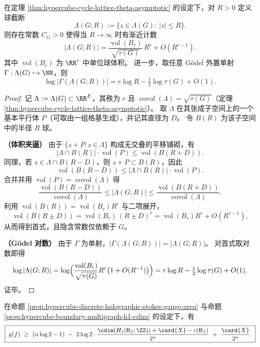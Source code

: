 \begin{corollary}\label{cor:hypercube-cycle-lattice-counting-godel-log}
在定理 \ref{thm:hypercube-cycle-lattice-theta-asymptotic} 的设定下，对 \(R>0\) 定义球截断
\[
\Lambda(G;R):=\{z\in\Lambda(G):\ |z|\le R\}.
\]
则存在常数 \(C_G>0\) 使得当 \(R\to\infty\) 时有渐近计数
\[
\boxed{\;
|\Lambda(G;R)|
=\frac{\operatorname{vol}(B_r)}{\sqrt{\tau(G)}}\,R^r+O(R^{r-1}).
\;}
\]
其中 \(\operatorname{vol}(B_r)\) 为 \(\RR^{r}\) 中单位球体积。
进一步，取任意 Gödel 外置单射 \(\Gamma:\Lambda(G)\hookrightarrow\NN\)，则
\[
\boxed{\;
\log|\Gamma(\Lambda(G;R))|
=r\log R-\tfrac12\log\tau(G)+O(1).
\;}
\]
\end{corollary}
\begin{proof}
记 \(\Lambda:=\Lambda(G)\subset \RR^{E}\)，其秩为 \(r\) 且 \(\operatorname{covol}(\Lambda)=\sqrt{\tau(G)}\)（定理 \ref{thm:hypercube-cycle-lattice-theta-asymptotic}）。
取 \(\Lambda\) 在其张成子空间上的一个基本平行体 \(P\)（可取由一组格基生成），并记其直径为 \(D\)。
令 \(B(R)\) 为该子空间中的半径 \(R\) 球。
\par
\textbf{（体积夹逼）}
由于 \(\{z+P:z\in\Lambda\}\) 构成无交叠的平移铺砌，有
\[
|\Lambda\cap B(R)|\cdot \operatorname{vol}(P)
\le \operatorname{vol}(B(R+D)).
\]
同理，若 \(z\in\Lambda\cap B(R-D)\)，则 \(z+P\subset B(R)\)，因此
\[
\operatorname{vol}(B(R-D))
\le |\Lambda\cap B(R)|\cdot \operatorname{vol}(P).
\]
合并并用 \(\operatorname{vol}(P)=\operatorname{covol}(\Lambda)\) 得
\[
\frac{\operatorname{vol}(B(R-D))}{\operatorname{covol}(\Lambda)}
\le |\Lambda(G;R)|
\le \frac{\operatorname{vol}(B(R+D))}{\operatorname{covol}(\Lambda)}.
\]
利用 \(\operatorname{vol}(B(R))=\operatorname{vol}(B_r)R^r\) 与二项展开，
\[
\operatorname{vol}(B(R\pm D))
=\operatorname{vol}(B_r)\,(R\pm D)^r
=\operatorname{vol}(B_r)R^r+O(R^{r-1}),
\]
从而得到首式，且隐含常数仅依赖于 \(G\)。
\par
\textbf{（Gödel 对数）}
由于 \(\Gamma\) 为单射，\(|\Gamma(\Lambda(G;R))|=|\Lambda(G;R)|\)。
对首式取对数即得
\[
\log|\Lambda(G;R)|
=\log\Bigl(\frac{\operatorname{vol}(B_r)}{\sqrt{\tau(G)}}R^r\bigl(1+O(R^{-1})\bigr)\Bigr)
=r\log R-\tfrac12\log\tau(G)+O(1).
\]
证毕。
\end{proof}



\begin{corollary}[回路圆维与规范体积的互补下界]\label{cor:hypercube-loop-cdim-gauge-volume-complement}
在命题 \ref{prop:hypercube-discrete-holographic-stokes-gauge-area} 与命题 \ref{prop:hypercube-boundary-multigraph-h1-cdim} 的设定下，有
\[
\boxed{\;
g(f)\ \ge\ (n\log 2-1)\ -\ 2\log 2\cdot\frac{\cdim(H_1(\mathsf B_f;\ZZ))+\card{X}-c(\mathsf B_f)}{2^n}\ +\ \frac{\card{X}}{2^n}.
\;}
\]
\end{corollary}

